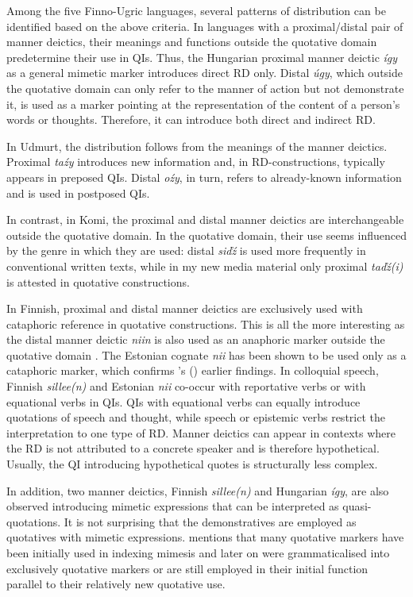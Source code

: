 \documentclass[output=paper,colorlinks,citecolor=brown]{langscibook}
\begin{document}
Among the five Finno-Ugric languages, several patterns of distribution can be identified based on the above criteria. In languages with a proximal/distal pair of manner deictics, their meanings and functions outside the quotative domain predetermine their use in QIs. Thus, the Hungarian proximal manner deictic \textit{így} as a general mimetic marker introduces direct RD only. Distal \textit{úgy}, which outside the quotative domain can only refer to the manner of action but not demonstrate it, is used as a marker pointing at the representation of the content of a person’s words or thoughts. Therefore, it can introduce both direct and indirect RD.

In Udmurt, the distribution follows from the meanings of the manner deictics. Proximal \textit{taźy} introduces new information and, in RD-constructions, typically appears in preposed QIs. Distal \textit{oźy}, in turn, refers to already-known information and is used in postposed QIs.

In contrast, in Komi, the proximal and distal manner deictics are interchangeable outside the quotative domain. In the quotative domain, their use seems influenced by the genre in which they are used: distal \textit{siďź} is used more frequently in conventional written texts, while in my new media material only proximal \textit{taďź(i)} is attested in quotative constructions.

In Finnish, proximal and distal manner deictics are exclusively used with cataphoric reference in quotative constructions. This is all the more interesting as the distal manner deictic \textit{niin} is also used as an anaphoric marker outside the quotative domain \citep[160]{König2017}. The Estonian cognate \textit{nii} has been shown to be used only as a cataphoric marker, which confirms \citeauthor{Keevallik2005}’s (\citeyear[116-117]{Keevallik2005}) earlier findings. In colloquial speech, Finnish \textit{sillee(n)} and Estonian \textit{nii} co-occur with reportative verbs or with equational verbs in QIs. QIs with equational verbs can equally introduce quotations of speech and thought, while speech or epistemic verbs restrict the interpretation to one type of RD. Manner deictics can appear in contexts where the RD is not attributed to a concrete speaker and is therefore hypothetical. Usually, the QI introducing hypothetical quotes is structurally less complex.

In addition, two manner deictics, Finnish \textit{sillee(n)} and Hungarian \textit{így}, are also observed introducing mimetic expressions that can be interpreted as quasi-quotations. It is not surprising that the demonstratives are employed as quotatives with mimetic expressions. \citet[521]{Güldemann2008} mentions that many quotative markers have been initially used in indexing mimesis and later on were grammaticalised into exclusively quotative markers or are still employed in their initial function parallel to their relatively new quotative use.
\end{document}
